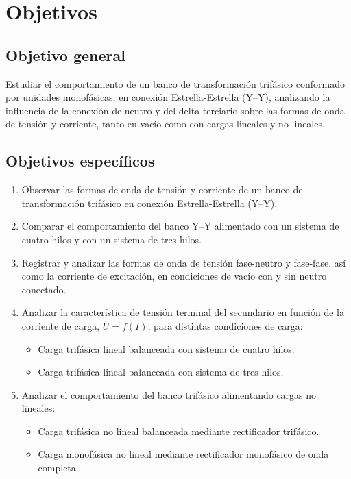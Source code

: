 \documentclass[12pt]{article}
\begin{document}
\section{Objetivos}

\subsection*{Objetivo general}
Estudiar el comportamiento de un banco de transformaci\'on trif\'asico conformado por unidades monof\'asicas, en conexi\'on Estrella-Estrella (Y--Y), analizando la influencia de la conexi\'on de neutro y del delta terciario sobre las formas de onda de tensi\'on y corriente, tanto en vac\'io como con cargas lineales y no lineales.

\subsection*{Objetivos espec\'ificos}
\begin{enumerate}
    \item Observar las formas de onda de tensi\'on y corriente de un banco de transformaci\'on trif\'asico en conexi\'on Estrella-Estrella (Y--Y).
    \item Comparar el comportamiento del banco Y--Y alimentado con un sistema de cuatro hilos y con un sistema de tres hilos.
    \item Registrar y analizar las formas de onda de tensi\'on fase-neutro y fase-fase, as\'i como la corriente de excitaci\'on, en condiciones de vac\'io con y sin neutro conectado.
    \item Analizar la caracter\'istica de tensi\'on terminal del secundario en funci\'on de la corriente de carga, $U=f(I)$, para distintas condiciones de carga:
    \begin{itemize}
        \item Carga trif\'asica lineal balanceada con sistema de cuatro hilos.
        \item Carga trif\'asica lineal balanceada con sistema de tres hilos.
    \end{itemize}
    \item Analizar el comportamiento del banco trif\'asico alimentando cargas no lineales:
    \begin{itemize}
        \item Carga trif\'asica no lineal balanceada mediante rectificador trif\'asico.
        \item Carga monof\'asica no lineal mediante rectificador monof\'asico de onda completa.
    \end{itemize}
\end{enumerate}
\end{document}

